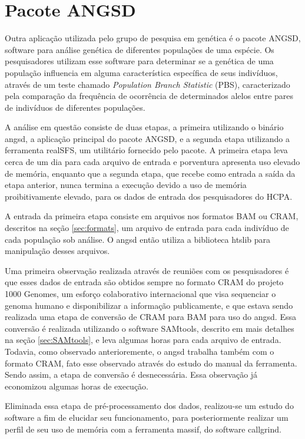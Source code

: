 \documentclass[cic,tc]{iiufrgs}
\begin{document}
\chapter{Pacote ANGSD}
\label{sec:angsd}

Outra aplicação utilizada pelo grupo de pesquisa em genética é o pacote ANGSD,
software para análise genética de diferentes populações de uma
espécie.\cite{korneliussen2014angsd} Os pesquisadores utilizam esse software
para determinar se a genética de uma população influencia em alguma
característica específica de seus indivíduos, através de um teste chamado
\textit{Population Branch Statistic} (PBS), caracterizado pela comparação da
frequência de ocorrência de determinados alelos entre pares de
indivíduos de diferentes populações.\cite{yi2010sequencing}

A análise em questão consiste de duas etapas, a primeira utilizando o binário
angsd, a aplicação principal do pacote ANGSD, e a segunda etapa utilizando a
ferramenta realSFS, um utilitário fornecido pelo pacote. A primeira etapa leva
cerca de um dia para cada arquivo de entrada e porventura apresenta uso elevado
de memória, enquanto que a segunda etapa, que recebe como entrada a saída da
etapa anterior, nunca termina a execução devido a uso de memória
proibitivamente elevado, para os dados de entrada dos pesquisadores do HCPA.

A entrada da primeira etapa consiste em arquivos nos formatos BAM ou CRAM,
descritos na seção \ref{sec:formats}, um arquivo de entrada para cada indivíduo
de cada população sob análise. O angsd então utiliza a biblioteca
htslib\cite{bonfield2021htslib} para manipulação desses arquivos.

Uma primeira observação realizada através de reuniões com os pesquisadores é
que esses dados de entrada são obtidos sempre no formato CRAM do projeto 1000
Genomes, um esforço colaborativo internacional que visa sequenciar o genoma
humano e disponibilizar a informação publicamente,\cite{via20101000} e que
estava sendo realizada uma etapa de conversão de CRAM para BAM para uso do
angsd. Essa conversão é realizada utilizando o software SAMtools, descrito em
mais detalhes na seção \ref{sec:SAMtools}, e leva algumas horas para cada
arquivo de entrada. Todavia, como observado anterioremente, o angsd trabalha
também com o formato CRAM, fato esse observado através do estudo do manual da
ferramenta.  Sendo assim, a etapa de conversão é desnecessária. Essa observação
já economizou algumas horas de execução.

Eliminada essa etapa de pré-processamento dos dados, realizou-se um estudo do
software a fim de elucidar seu funcionamento, para posteriormente realizar um
perfil de seu uso de memória com a ferramenta massif, do software
callgrind.\cite{weidendorfer2008sequential}
\end{document}
